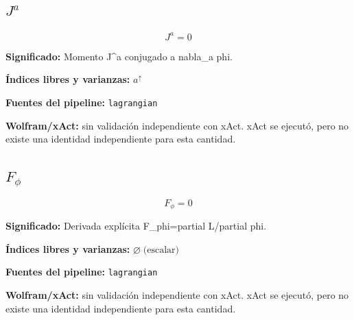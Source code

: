 \documentclass[11pt]{article}
\begin{document}
\subsection*{$ J^a $}
\begin{dmath*}[breakdepth={5}]
J^a = 0
\end{dmath*}
\par\vspace{1.2\baselineskip}\noindent
\begin{minipage}{\linewidth}
\textbf{Significado:} Momento J^a conjugado a nabla\_a phi.\par
\textbf{Índices libres y varianzas:} $ a^{\uparrow} $\par
\textbf{Fuentes del pipeline:} \texttt{lagrangian}\par
\textbf{Wolfram/xAct:} sin validación independiente con xAct. xAct se ejecutó, pero no existe una identidad independiente para esta cantidad.\par
\end{minipage}
\subsection*{$ F_{\phi} $}
\begin{dmath*}[breakdepth={5}]
F_{\phi} = 0
\end{dmath*}
\par\vspace{1.2\baselineskip}\noindent
\begin{minipage}{\linewidth}
\textbf{Significado:} Derivada explícita F\_phi=partial L/partial phi.\par
\textbf{Índices libres y varianzas:} $ \varnothing\;\text{(escalar)} $\par
\textbf{Fuentes del pipeline:} \texttt{lagrangian}\par
\textbf{Wolfram/xAct:} sin validación independiente con xAct. xAct se ejecutó, pero no existe una identidad independiente para esta cantidad.\par
\end{minipage}
\end{document}

